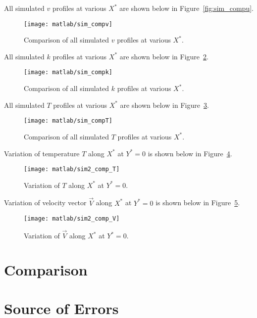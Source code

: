 All simulated $v$ profiles at various $X^*$ are shown below in Figure~\ref{fig:sim_compu}.
\begin{figure}[H]
	\centering
	\texttt{[image: matlab/sim\_compv]}
	\caption{Comparison of all simulated $v$ profiles at various $X^*$.}
	\label{fig:sim_compv}
\end{figure}


All simulated $k$ profiles at various $X^*$ are shown below in Figure~\ref{fig:sim_compk}.
\begin{figure}[H]
	\centering
	\texttt{[image: matlab/sim\_compk]}
	\caption{Comparison of all simulated $k$ profiles at various $X^*$.}
	\label{fig:sim_compk}
\end{figure}

All simulated $T$ profiles at various $X^*$ are shown below in Figure~\ref{fig:sim_compT}.
\begin{figure}[H]
	\centering
	\texttt{[image: matlab/sim\_compT]}
	\caption{Comparison of all simulated $T$ profiles at various $X^*$.}
	\label{fig:sim_compT}
\end{figure}


Variation of temperature $T$ along $X^*$ at $Y^*=0$ is shown below in Figure~\ref{fig:sim2_comp_T}.
\begin{figure}[H]
	\centering
	\texttt{[image: matlab/sim2\_comp\_T]}
	\caption{Variation of $T$ along $X^*$ at $Y^*=0$.}
	\label{fig:sim2_comp_T}
\end{figure}

Variation of velocity vector $\vec{V}$ along $X^*$ at $Y^*=0$ is shown below in Figure~\ref{fig:sim2_comp_V}.
\begin{figure}[H]
	\centering
	\texttt{[image: matlab/sim2\_comp\_V]}
	\caption{Variation of $\vec{V}$ along $X^*$ at $Y^*=0$.}
	\label{fig:sim2_comp_V}
\end{figure}


\section{Comparison}
\label{sec:comp}


\section{Source of Errors}
\label{sec:err}

